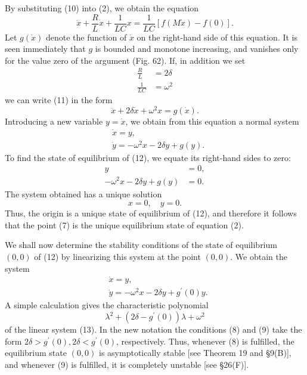 \documentclass[10pt,a5paper]{book}
\theoremstyle{plain}
\theoremstyle{definition}
\theoremstyle{remark}
\begin{document}
By substituting (10) into (2), we obtain the equation
\begin{equation*}
\ddot{x}+\frac{R}{L} \dot{x}+\frac{1}{L C} x=\frac{1}{L C}[f(M \dot{x})-f(0)] . \tag{11}
\end{equation*}
Let $g(\dot{x})$ denote the function of $\dot{x}$ on the right-hand side of this equation. It is seen immediately that $g$ is bounded and monotone increasing, and vanishes only for the value zero of the argument (Fig. 62). If, in addition we set
\[
\begin{aligned}
\frac{R}{L} & =2 \delta \\
\frac{1}{L C} & =\omega^{2}
\end{aligned}
\]
we can write (11) in the form
\[
\ddot{x}+2 \delta \dot{x}+\omega^{2} x=g(\dot{x}) .
\]
Introducing a new variable $y=\dot{x}$, we obtain from this equation a normal system
\begin{align*}
& \dot{x}=y, \\
& \dot{y}=-\omega^{2} x-2 \delta y+g(y) . \tag{12}
\end{align*}
To find the state of equilibrium of (12), we equate its right-hand sides to zero:
\[
\begin{aligned}
y & =0, \\
-\omega^{2} x-2 \delta y+g(y) & =0 .
\end{aligned}
\]
The system obtained has a unique solution
\[
x=0, \quad y=0 .
\]
Thus, the origin is a unique state of equilibrium of (12), and therefore it follows that the point (7) is the unique equilibrium state of equation (2).

We shall now determine the stability conditions of the state of equilibrium $(0,0)$ of (12) by linearizing this system at the point $(0,0)$. We obtain the system
\begin{align*}
& \dot{x}=y, \\
& \dot{y}=-\omega^{2} x-2 \delta y+g^{\prime}(0) y . \tag{13}
\end{align*}
A simple calculation gives the characteristic polynomial
\[
\lambda^{2}+\left(2 \delta-g^{\prime}(0)\right) \lambda+\omega^{2}
\]
of the linear system (13). In the new notation the conditions (8) and (9) take the form $2 \delta>g^{\prime}(0), 2 \delta<g^{\prime}(0)$, respectively. Thus, whenever (8) is fulfilled, the equilibrium state $(0,0)$ is asymptotically stable [see Theorem 19 and §9(B)], and whenever (9) is fulfilled, it is completely unstable [see §26(F)].
\end{document}
